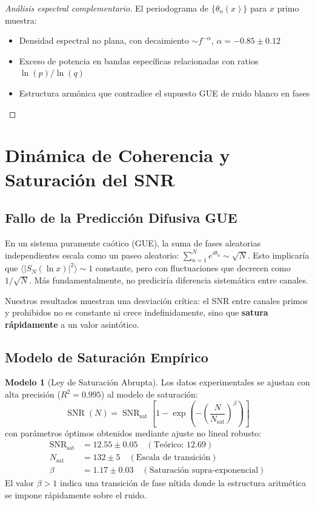 \documentclass[12pt, a4paper]{article}
\theoremstyle{plain}
\theoremstyle{definition}
\newtheorem{modelo}[teorema]{Modelo}
\newcommand{\SNR}{\operatorname{SNR}}
\begin{document}
\begin{proof}[Análisis espectral complementario]
El periodograma de $\{\theta_n(x)\}$ para $x$ primo muestra:
\begin{itemize}
\item Densidad espectral no plana, con decaimiento $\sim f^{-\alpha}$, $\alpha = -0.85 \pm 0.12$
\item Exceso de potencia en bandas específicas relacionadas con ratios $\ln(p)/\ln(q)$
\item Estructura armónica que contradice el supuesto GUE de ruido blanco en fases
\end{itemize}
\end{proof}

\section{Dinámica de Coherencia y Saturación del SNR}

\subsection{Fallo de la Predicción Difusiva GUE}

En un sistema puramente caótico (GUE), la suma de fases aleatorias independientes escala como un paseo aleatorio: $\sum_{n=1}^N e^{i\theta_n} \sim \sqrt{N}$. Esto implicaría que $\langle |S_N(\ln x)|^2 \rangle \sim 1$ constante, pero con fluctuaciones que decrecen como $1/\sqrt{N}$. Más fundamentalmente, no prediciría diferencia sistemática entre canales.

Nuestros resultados muestran una desviación crítica: el SNR entre canales primos y prohibidos no es constante ni crece indefinidamente, sino que \textbf{satura rápidamente} a un valor asintótico.

\subsection{Modelo de Saturación Empírico}

\begin{modelo}[Ley de Saturación Abrupta]
Los datos experimentales se ajustan con alta precisión ($R^2 = 0.995$) al modelo de saturación:
\[
\SNR(N) = \SNR_{\text{sat}} \left[ 1 - \exp\left(-\left(\frac{N}{N_{\text{sat}}}\right)^\beta\right) \right]
\]
con parámetros óptimos obtenidos mediante ajuste no lineal robusto:
\begin{align*}
\SNR_{\text{sat}} &= 12.55 \pm 0.05 \quad (\text{Teórico: } 12.69) \\
N_{\text{sat}} &= 132 \pm 5 \quad (\text{Escala de transición}) \\
\beta &= 1.17 \pm 0.03 \quad (\text{Saturación supra-exponencial})
\end{align*}
El valor $\beta > 1$ indica una transición de fase nítida donde la estructura aritmética se impone rápidamente sobre el ruido.
\end{modelo}
\end{document}
